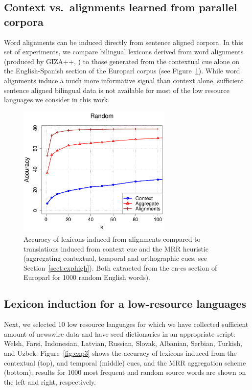 \documentclass{article}
\newcommand{\secref}[1]{Section~\ref{#1}}
\newcommand{\figref}[1]{Figure~\ref{#1}}
\begin{document}
\subsection{Context vs.\ alignments learned from parallel corpora} 

Word alignments can be induced directly from sentence aligned corpora.  In this set of experiments, we compare bilingual lexicons derived from word alignments (produced by GIZA++, \cite{Och:2003}) to those generated from the contextual cue alone on the English-Spanish section of the Europarl corpus (see \figref{fig:exp2}). While word alignments induce a much more informative signal than context alone, sufficient sentence aligned bilingual data is not available for most of the low resource languages we consider in this work.\\

\begin{figure}[h!]
\centerline{\mbox{\includegraphics[width=3in]{figures/exp2/alignvscontext}}}
\caption{Accuracy of lexicons induced from alignments compared to translations induced from context cue and the MRR heuristic (aggregating contextual, temporal and orthographic cues, see \secref{sect:exphigh}).  Both extracted from the en-es section of Europarl for 1000 random English words).} 
\label{fig:exp2}
\end{figure}

\subsection{Lexicon induction for a low-resource languages}

Next, we selected 10 low resource languages for which we have collected sufficient amount of newswire data and have seed dictionaries in an appropriate script: Welsh, Farsi, Indonesian, Latvian, Russian, Slovak, Albanian, Serbian, Turkish, and Uzbek.  \figref{fig:exp3} shows the accuracy of lexicons induced from the contextual (top), and temporal (middle) cues, and the MRR aggregation scheme (bottom); results for 1000 most frequent and random source words are shown on the left and right, respectively.\\
\end{document}
